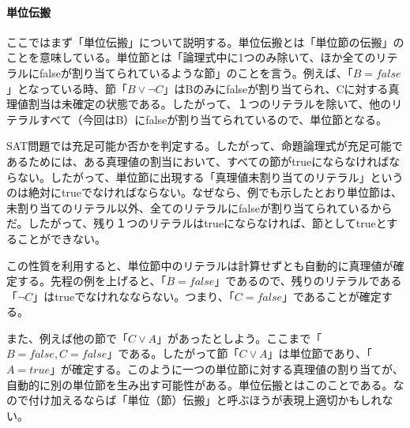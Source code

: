 \documentclass[dvipdfmx]{jsarticle}
\begin{document}
\paragraph{単位伝搬}
ここではまず「単位伝搬」について説明する。単位伝搬とは「単位節の伝搬」のことを意味している。単位節とは「論理式中に1つのみ除いて、ほか全てのリテラルにfalseが割り当てられているような節」のことを言う。例えば、「$B=false$」となっている時、節「$B \vee \neg C$」はBのみにfalseが割り当てられ、Cに対する真理値割当は未確定の状態である。したがって、１つのリテラルを除いて、他のリテラルすべて（今回はB）にfalseが割り当てられているので、単位節となる。\par
SAT問題では充足可能か否かを判定する。したがって、命題論理式が充足可能であるためには、ある真理値の割当において、すべての節がtrueにならなければならない。したがって、単位節に出現する「真理値未割り当てのリテラル」というのは絶対にtrueでなければならない。なぜなら、例でも示したとおり単位節は、未割り当てのリテラル以外、全てのリテラルにfalseが割り当てられているからだ。したがって、残り１つのリテラルはtrueにならなければ、節としてtrueとすることができない。\par
この性質を利用すると、単位節中のリテラルは計算せずとも自動的に真理値が確定する。先程の例を上げると、「$B = false$」であるので、残りのリテラルである「$\neg C$」はtrueでなけれなならない。つまり、「$C = false$」であることが確定する。\par
また、例えば他の節で「$C\vee A$」があったとしよう。ここまで「$B=false, C = false$」である。したがって節「$C\vee A$」は単位節であり、「$A = true$」が確定する。このように一つの単位節に対する真理値の割り当てが、自動的に別の単位節を生み出す可能性がある。単位伝搬とはこのことである。なので付け加えるならば「単位（節）伝搬」と呼ぶほうが表現上適切かもしれない。
\end{document}
